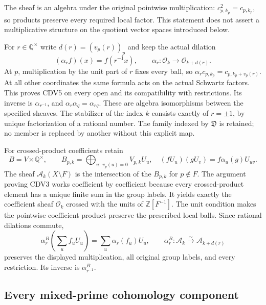 The sheaf is an algebra under the original pointwise multiplication:
$c_{p,k_p}^2=c_{p,k_p}$, so products preserve every required local
factor. This statement does not assert a multiplicative structure on
the quotient vector spaces introduced below.

For $r\in\mathbb Q^\times$ write
$d(r)=(v_p(r))_p$ and keep the actual dilation
\begin{equation}\tag{CDV5}
 (\alpha_r f)(x)=f(r^{-1}x),\qquad
 \alpha_r:\mathcal O_k\longrightarrow\mathcal O_{k+d(r)}.
\end{equation}
At $p$, multiplication by the unit part of $r$ fixes every ball, so
$\alpha_r c_{p,k_p}=c_{p,k_p+v_p(r)}$. At all other coordinates the
same formula acts on the actual Schwartz factors. This proves CDV5
on every open and its compatibility with restrictions. Its inverse is
$\alpha_{r^{-1}}$, and $\alpha_r\alpha_q=\alpha_{rq}$. These are
algebra isomorphisms between the specified sheaves. The stabilizer of
the index $k$ consists exactly of $r=\pm1$, by unique factorization
of a rational number. The family indexed by $\mathfrak D$ is retained;
no member is replaced by another without this explicit map.

For crossed-product coefficients retain
\begin{equation}\tag{CDV6}
 B=V\rtimes\mathbb Q^\times,\qquad
 B_{p,k}=\bigoplus_{u:\ v_p(u)=0}V_{p,k}U_u,
 \quad (fU_u)(gU_v)=f\alpha_u(g)U_{uv}.
\end{equation}
The sheaf $\mathcal A_k(X\setminus F)$ is the intersection of the
$B_{p,k}$ for $p\notin F$. The argument proving CDV3 works coefficient
by coefficient because every crossed-product element has a unique
finite sum in the group labels. It yields exactly the coefficient
sheaf $\mathcal O_k$ crossed with the units of $\mathbb Z[F^{-1}]$.
The unit condition makes the pointwise coefficient product preserve
the prescribed local balls. Since rational dilations commute,
\begin{equation}\tag{CDV7}
 \alpha_r^B\left(\sum_u f_uU_u\right)
     =\sum_u\alpha_r(f_u)U_u,
 \qquad\alpha_r^B:\mathcal A_k\xrightarrow{\sim}\mathcal A_{k+d(r)}
\end{equation}
preserves the displayed multiplication, all original group labels,
and every restriction. Its inverse is $\alpha_{r^{-1}}^B$.

\subsection{Every mixed-prime cohomology component}

